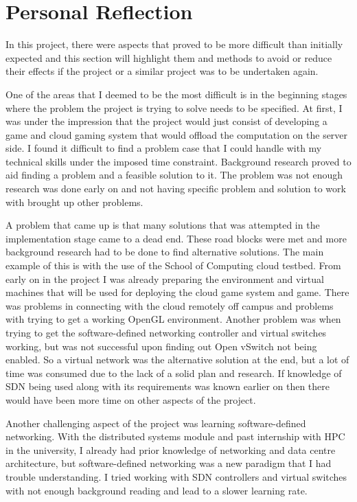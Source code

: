 \section{Personal Reflection}
In this project, there were aspects that proved to be more difficult than initially expected and this section will highlight them and methods to avoid or reduce their effects if the project or a similar project was to be undertaken again.
\newline
\par
One of the areas that I deemed to be the most difficult is in the beginning stages where the problem the project is trying to solve needs to be specified. At first, I was under the impression that the project would just consist of developing a game and cloud gaming system that would offload the computation on the server side. I found it difficult to find a problem case that I could handle with my technical skills under the imposed time constraint. Background research proved to aid finding a problem and a feasible solution to it. The problem was not enough research was done early on and not having specific problem and solution to work with brought up other problems.
\newline
\par
A problem that came up is that many solutions that was attempted in the implementation stage came to a dead end. These road blocks were met and more background research had to be done to find alternative solutions. The main example of this is with the use of the School of Computing cloud testbed. From early on in the project I was already preparing the environment and virtual machines that will be used for deploying the cloud game system and game. There was problems in connecting with the cloud remotely off campus and problems with trying to get a working OpenGL environment. Another problem was when trying to get the software-defined networking controller and virtual switches working, but was not successful upon finding out Open vSwitch not being enabled. So a virtual network was the alternative solution at the end, but a lot of time was consumed due to the lack of a solid plan and research. If knowledge of SDN being used along with its requirements was known earlier on then there would have been more time on other aspects of the project.
\newline
\par
Another challenging aspect of the project was learning software-defined networking. With the distributed systems module and past internship with HPC in the university, I already had prior knowledge of networking and data centre architecture, but software-defined networking was a new paradigm that I had trouble understanding. I tried working with SDN controllers and virtual switches with not enough background reading and lead to a slower learning rate.
